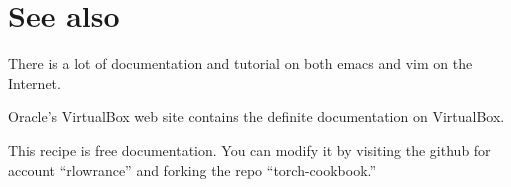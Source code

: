 \documentclass{article}
\begin{document}
\section{See also}

There is a lot of documentation and tutorial on both emacs and vim on
the Internet.

Oracle's VirtualBox web site contains the definite documentation on
VirtualBox.

This recipe is free documentation. You can modify it by visiting the
github for account ``rlowrance'' and forking the repo
``torch-cookbook.''
\end{document}
